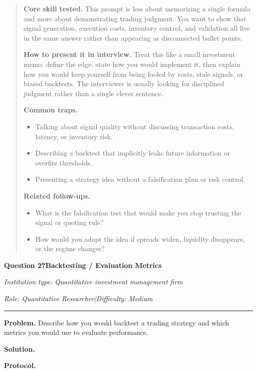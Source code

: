 \documentclass[11pt,letterpaper,openany]{book}
\newenvironment{EditorialNote}
  {\begin{quote}\small\setlength{\parskip}{0.25em}}
  {\end{quote}}
\newcommand{\QuestionSpacer}{\vspace{0.4em}}
\newcommand{\InterviewQuestionHeader}[5]{%
  \vspace{1.0em}%
  {\large\bfseries #1\enspace #4\par}%
  {\small\itshape Institution type: #2\par}%
  {\small\itshape Role: #3\enspace |\enspace Difficulty: #5\par}%
  \vspace{0.25em}\hrule\vspace{0.45em}%
}
\begin{document}
\begin{EditorialNote}


\textbf{Core skill tested.} This prompt is less about memorizing a single formula and more about demonstrating trading judgment. You want to show that signal generation, execution costs, inventory control, and validation all live in the same answer rather than appearing as disconnected bullet points.

\textbf{How to present it in interview.} Treat this like a small investment memo: define the edge, state how you would implement it, then explain how you would keep yourself from being fooled by costs, stale signals, or biased backtests. The interviewer is usually looking for disciplined judgment rather than a single clever sentence.

\textbf{Common traps.}
\begin{itemize}
\item Talking about signal quality without discussing transaction costs, latency, or inventory risk.
\item Describing a backtest that implicitly leaks future information or overfits thresholds.
\item Presenting a strategy idea without a falsification plan or risk control.
\end{itemize}

\textbf{Related follow-ups.}
\begin{itemize}
\item What is the falsification test that would make you stop trusting the signal or quoting rule?
\item How would you adapt the idea if spreads widen, liquidity disappears, or the regime changes?
\end{itemize}


\end{EditorialNote}
\QuestionSpacer

\InterviewQuestionHeader{Question 27}{Quantitative investment management firm}{Quantitative Researcher}{Backtesting / Evaluation Metrics}{Medium}
\textbf{Problem.} Describe how you would backtest a trading strategy and which metrics you would use to evaluate performance.

\textbf{Solution.}

\textbf{Protocol.}
\end{document}
